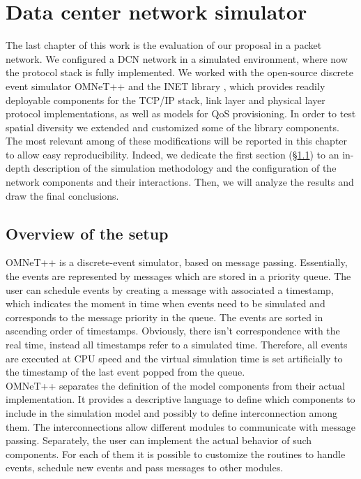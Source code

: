 \chapter{Data center network simulator}
\label{ch:dcn-simulations}
The last chapter of this work is the evaluation of our proposal in a packet network. We configured a DCN network in a simulated environment, where now the protocol stack is fully implemented. We worked with the open-source discrete event simulator OMNeT++ \cite{omnetpp} and the INET library \cite{inet}, which provides readily deployable components for the TCP/IP stack, link layer and physical layer protocol implementations, as well as models for QoS provisioning. In order to test spatial diversity we extended and customized some of the library components. The most relevant among of these modifications will be reported in this chapter to allow easy reproducibility. Indeed, we dedicate the first section (\S \ref{sec:opp-setup}) to an in-depth description of the simulation methodology and the configuration of the network components and their interactions. Then, we will analyze the results and draw the final conclusions. 
\section{Overview of the setup}
\label{sec:opp-setup}
OMNeT++ is a discrete-event simulator, based on message passing. Essentially, the events are represented by messages which are stored in a priority queue. The user can schedule events by creating a message with associated a timestamp, which indicates the moment in time when events need to be simulated and corresponds to the message priority in the queue.  The events are sorted in ascending order of timestamps.  Obviously, there isn't correspondence with the real time, instead all timestamps refer to a simulated time. Therefore, all events are executed at CPU speed and the virtual simulation time is set artificially to the timestamp of the last event popped from the queue. \\ OMNeT++ separates the definition of the model components from their actual implementation. It provides a descriptive language to define which components to include in the simulation model and possibly to define interconnection among them. The interconnections allow different modules to communicate with message passing. Separately, the user can implement the actual behavior of such components. For each of them it is possible to customize the routines to handle events, schedule new events and pass messages to other modules.

